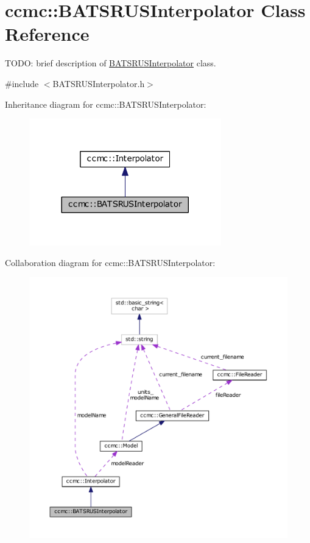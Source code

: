 \hypertarget{classccmc_1_1_b_a_t_s_r_u_s_interpolator}{\section{ccmc\-:\-:B\-A\-T\-S\-R\-U\-S\-Interpolator Class Reference}
\label{classccmc_1_1_b_a_t_s_r_u_s_interpolator}
}


T\-O\-D\-O\-: brief description of \hyperlink{classccmc_1_1_b_a_t_s_r_u_s_interpolator}{B\-A\-T\-S\-R\-U\-S\-Interpolator} class.  




{\ttfamily \#include $<$B\-A\-T\-S\-R\-U\-S\-Interpolator.\-h$>$}



Inheritance diagram for ccmc\-:\-:B\-A\-T\-S\-R\-U\-S\-Interpolator\-:\nopagebreak
\begin{figure}[H]
\begin{center}
\leavevmode
\includegraphics[width=236pt]{classccmc_1_1_b_a_t_s_r_u_s_interpolator__inherit__graph}
\end{center}
\end{figure}


Collaboration diagram for ccmc\-:\-:B\-A\-T\-S\-R\-U\-S\-Interpolator\-:\nopagebreak
\begin{figure}[H]
\begin{center}
\leavevmode
\includegraphics[width=350pt]{classccmc_1_1_b_a_t_s_r_u_s_interpolator__coll__graph}
\end{center}
\end{figure}
